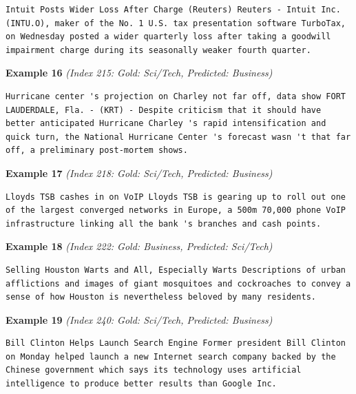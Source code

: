 \begin{Verbatim}[breaklines=true,breakanywhere=true,fontsize=\small]
Intuit Posts Wider Loss After Charge (Reuters) Reuters - Intuit Inc. (INTU.O), maker of the No. 1 U.S. tax presentation software TurboTax, on Wednesday posted a wider quarterly loss after taking a goodwill impairment charge during its seasonally weaker fourth quarter.
\end{Verbatim}

\noindent
\textbf{Example 16} \quad \textit{(Index 215: Gold: Sci/Tech, Predicted: Business)}

\begin{Verbatim}[breaklines=true,breakanywhere=true,fontsize=\small]
Hurricane center 's projection on Charley not far off, data show FORT LAUDERDALE, Fla. - (KRT) - Despite criticism that it should have better anticipated Hurricane Charley 's rapid intensification and quick turn, the National Hurricane Center 's forecast wasn 't that far off, a preliminary post-mortem shows.
\end{Verbatim}

\noindent
\textbf{Example 17} \quad \textit{(Index 218: Gold: Sci/Tech, Predicted: Business)}

\begin{Verbatim}[breaklines=true,breakanywhere=true,fontsize=\small]
Lloyds TSB cashes in on VoIP Lloyds TSB is gearing up to roll out one of the largest converged networks in Europe, a 500m 70,000 phone VoIP infrastructure linking all the bank 's branches and cash points.
\end{Verbatim}

\noindent
\textbf{Example 18} \quad \textit{(Index 222: Gold: Business, Predicted: Sci/Tech)}

\begin{Verbatim}[breaklines=true,breakanywhere=true,fontsize=\small]
Selling Houston Warts and All, Especially Warts Descriptions of urban afflictions and images of giant mosquitoes and cockroaches to convey a sense of how Houston is nevertheless beloved by many residents.
\end{Verbatim}

\noindent
\textbf{Example 19} \quad \textit{(Index 240: Gold: Sci/Tech, Predicted: Business)}

\begin{Verbatim}[breaklines=true,breakanywhere=true,fontsize=\small]
Bill Clinton Helps Launch Search Engine Former president Bill Clinton on Monday helped launch a new Internet search company backed by the Chinese government which says its technology uses artificial intelligence to produce better results than Google Inc.
\end{Verbatim}

